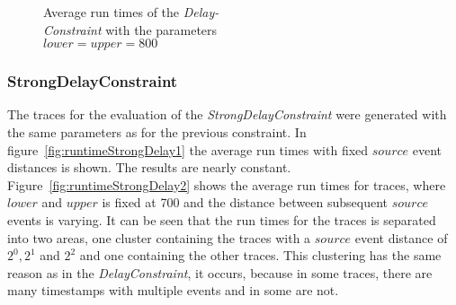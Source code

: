 \begin{figure}
\begin{minipage}{0.45\textwidth}
			\centering
			\caption{Average run times of the \textit{Delay-\\Constraint} with the parameters\\ $lower = upper = 800$}
			\label{fig:runtimeDelay2}
		\end{minipage}
		
	\end{figure}


\subsubsection{StrongDelayConstraint}
	The traces for the evaluation of the \textit{StrongDelayConstraint} were generated with the same parameters as for the previous constraint. In figure~\ref{fig:runtimeStrongDelay1} the average run times with fixed $source$ event distances is shown. The results are nearly constant. Figure~\ref{fig:runtimeStrongDelay2} shows the average run times for traces, where $lower$ and $upper$ is fixed at 700 and the distance between subsequent $source$ events is varying. It can be seen that the run times for the traces is separated into two areas, one cluster containing the traces with a $source$ event distance of $2^0, 2^1$ and $2^2$ and one containing the other traces. This clustering has the same reason as in the \textit{DelayConstraint}, it occurs, because in some traces, there are many timestamps with multiple events and in some are not.
	
